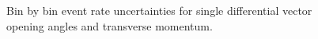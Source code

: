 \documentclass{article}
\begin{document}
\begin{figure}
    \caption{Bin by bin event rate uncertainties for single differential vector opening angles and transverse momentum.}
    \label{fig:bin-uncertainties-rates-opening-angles-transverse}
\end{figure}
\end{document}
